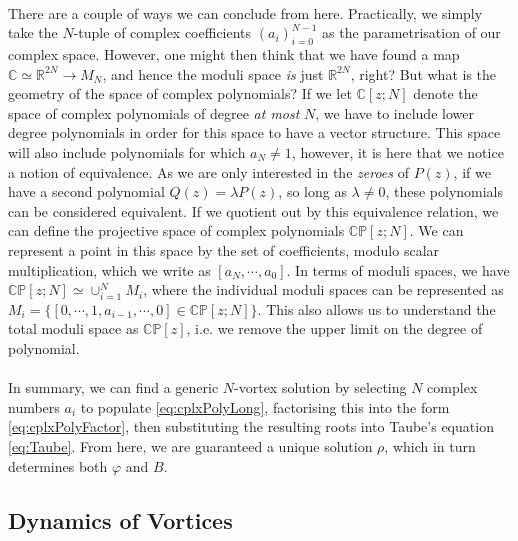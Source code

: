 \documentclass[11pt, fleqn]{article}
\begin{document}
\paragraph{} There are a couple of ways we can conclude from here. Practically, we simply take the $ N $-tuple of complex coefficients $ (a_i)_{i=0}^{N-1} $ as the parametrisation of our complex space. However, one might then think that we have found a map $ \mathbb{C} \simeq \mathbb{R}^{2N} \to M_N $, and hence the moduli space \textit{is} just $ \mathbb{R}^{2N} $, right? But what is the geometry of the space of complex polynomials? If we let $ \mathbb{C}[z;N] $ denote the space of complex polynomials of degree \textit{at most} $ N $, we have to include lower degree polynomials in order for this space to have a vector structure. This space will also include polynomials for which $ a_N \neq 1 $, however, it is here that we notice a notion of equivalence. As we are only interested in the \textit{zeroes} of $ P(z) $, if we have a second polynomial $ Q(z) =  \lambda P(z) $, so long as $ \lambda \neq 0 $, these polynomials can be considered equivalent. If we quotient out by this equivalence relation, we can define the projective space of complex polynomials $ \mathbb{CP}[z;N] $. We can represent a point in this space by the set of coefficients, modulo scalar multiplication, which we write as $ [a_N, \cdots, a_0] $. In terms of moduli spaces, we have $ \mathbb{CP}[z;N] \simeq \cup_{i=1}^N M_i $, where the individual moduli spaces can be represented as $ M_i = \{ [ 0, \cdots, 1, a_{i-1}, \cdots, 0 ] \in \mathbb{CP}[z;N] \} $. This also allows us to understand the total moduli space as $ \mathbb{CP}[z] $, i.e. we remove the upper limit on the degree of polynomial.

\paragraph{} In summary, we can find a generic $ N $-vortex solution by selecting $ N $ complex numbers $ a_i $ to populate \eqref{eq:cplxPolyLong}, factorising this into the form \eqref{eq:cplxPolyFactor}, then substituting the resulting roots into Taube's equation \eqref{eq:Taube}. From here, we are guaranteed a unique solution $ \rho $, which in turn determines both $ \varphi $ and $ B $.


\subsection{Dynamics of Vortices}
\end{document}

